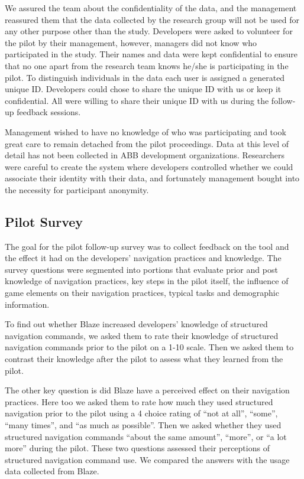 \documentclass{sig-alternate}
\begin{document}
We  assured the team about the confidentiality of the data, and the management reassured them that the data collected by the research group will not be used for any other purpose other than the study.  Developers were asked to volunteer for the pilot by their management, however, managers did not know who participated in the study. Their names and data were kept confidential to ensure that no one apart from the research team knows he/she is participating in the pilot.  To distinguish individuals in the data each user is assigned a generated unique ID.  Developers could chose to share the unique ID with us or keep it confidential.  All were willing to share their unique ID with us during the follow-up feedback sessions.   

Management wished to have no knowledge of who was participating and took great care to remain detached from the pilot proceedings.  Data at this level of detail has not been collected in ABB development organizations.  Researchers were careful to create the system where developers controlled whether we could associate their identity with their data, and fortunately management bought into the necessity for participant anonymity.

\subsection{Pilot Survey}

The goal for the pilot follow-up survey was to collect feedback on the tool and the effect it had on the developers' navigation practices and knowledge.  The survey questions were segmented into portions that evaluate prior and post knowledge of navigation practices, key steps in the pilot itself, the influence of game elements on their navigation practices, typical tasks and demographic information.

To find out whether Blaze increased developers'  knowledge of structured navigation commands, we asked them to rate their knowledge of structured navigation commands prior to the pilot on a 1-10 scale.  Then we asked them to contrast their knowledge after the pilot to assess what they learned from the pilot.

The other key question is did Blaze have a perceived effect on their navigation practices.  Here too we asked them to rate how much they used structured navigation prior to the pilot using a 4 choice rating of ``not at all'', ``some'', ``many times'', and ``as much as possible''.  Then we asked whether they used structured navigation commands ``about the same amount'', ``more'',  or ``a lot more'' during the pilot.  These two questions assessed their perceptions of structured navigation command use.  We compared the answers with the usage data collected from Blaze.
\end{document}
